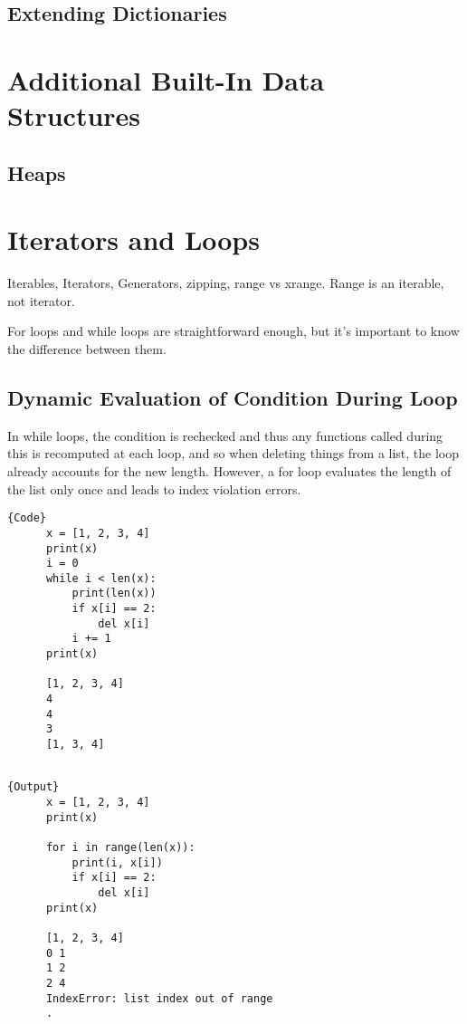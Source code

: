 \documentclass{article}
\begin{document}
  \subsection{Extending Dictionaries}

\section{Additional Built-In Data Structures}

  \subsection{Heaps} 

\section{Iterators and Loops}

  Iterables, Iterators, Generators, zipping, range vs xrange. Range is an iterable, not iterator. 

  For loops and while loops are straightforward enough, but it's important to know the difference between them. 

  \subsection{Dynamic Evaluation of Condition During Loop}

    In while loops, the condition is rechecked and thus any functions called during this is recomputed at each loop, and so when deleting things from a list, the loop already accounts for the new length. However, a for loop evaluates the length of the list only once and leads to index violation errors.  

    \noindent\begin{minipage}{.5\textwidth}
    \begin{lstlisting}[]{Code}
      x = [1, 2, 3, 4]
      print(x)
      i = 0
      while i < len(x): 
          print(len(x))
          if x[i] == 2: 
              del x[i]
          i += 1
      print(x)

      [1, 2, 3, 4]
      4
      4
      3
      [1, 3, 4]
      
    \end{lstlisting}
    \end{minipage}
    \hfill
    \begin{minipage}{.49\textwidth}
    \begin{lstlisting}[]{Output}
      x = [1, 2, 3, 4]
      print(x) 

      for i in range(len(x)):
          print(i, x[i])
          if x[i] == 2: 
              del x[i]
      print(x)

      [1, 2, 3, 4]
      0 1
      1 2
      2 4
      IndexError: list index out of range
      .
    \end{lstlisting}
    \end{minipage}
\end{document}
